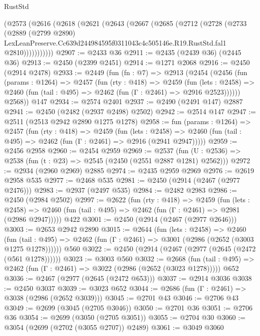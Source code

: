 \begin{lexlean}{RustStd}
\begin{coremodule}
    (@2573
      (@2616
        (@2618
          (@2621
            (@2643
              (@2667
                (@2685
                  (@2712
                    (@2728
                      (@2733
                        (@2889
                          (@2799 @2890)
                          LexLeanPreserve.Cc639d244984595f0311043c4c505146e.R19.RustStd.fal1
                          @2810)))))))))))
@2907 := @2433 @36
@2911 := @2435 (@2439 @36) (@2445 @36)
@2913 := @2450 (@2399 @2451)
@2914 := @1271 @2068
@2916 := @2450 (@2914 @2478)
@2933 := @2449
    (fun (fn : @7) =>
    @2913
      (@2454
        (@2456
          (fun (params : @1264) =>
          @2457
            (fun (rty : @418) =>
            @2459
              (fun (lets : @2458) =>
              @2460 (fun (tail : @495) => @2462 (fun (Γ : @2461) => @2916 @2523))))))
        @2568))
    @147
@2934 := @2574 @2401
@2937 := @2490 (@2491 @147) @2887
@2941 := @2450 (@2482 (@2937 @2498) @2502)
@2942 := @2514 @147
@2947 := @2511 (@2513 @2942 @2890 @1275 @1278)
@2958 := fun (params : @1264) =>
  @2457
    (fun (rty : @418) =>
    @2459
      (fun (lets : @2458) =>
      @2460 (fun (tail : @495) => @2462 (fun (Γ : @2461) => @2916 (@2941 @2947)))))
@2959 := @2456 @2958
@2960 := @2454 @2959
@2969 := @2537 (fun (U : @2536) => @2538 (fun (t : @23) => @2545 (@2450 (@2551 @2887 @1281) @2562)))
@2972 := @2934 (@2960 @2969) @2885
@2974 := @2435 @2959 @2969
@2976 := @2619 @2958 @535
@2977 := @2468 @535
@2981 := @2450 (@2914 (@2467 (@2977 @2476)))
@2983 := @2937 (@2497 @535)
@2984 := @2482 @2983
@2986 := @2450 (@2984 @2502)
@2997 := @2622
    (fun (rty : @418) =>
    @2459
      (fun (lets : @2458) =>
      @2460 (fun (tail : @495) => @2462 (fun (Γ : @2461) => @2981 (@2986 @2947)))))
    @422
@3001 := @2450 (@2914 (@2467 (@2977 @2646)))
@3003 := @2653 @2942 @2890
@3015 := @2644
    (fun (lets : @2458) =>
    @2460
      (fun (tail : @495) => @2462 (fun (Γ : @2461) => @3001 (@2986 (@2652 (@3003 @1275 @1278))))))
    @560
@3022 := @2450 (@2914 (@2467 (@2977 (@2645 (@2472 (@561 @1278))))))
@3023 := @3003 @560
@3032 := @2668
    (fun (tail : @495) => @2462 (fun (Γ : @2461) => @3022 (@2986 (@2652 (@3023 @1278)))))
    @652
@3036 := @2467 (@2977 (@2645 (@2472 @653)))
@3037 := @2914 @3036
@3038 := @2450 @3037
@3039 := @3023 @652
@3044 := @2686 (fun (Γ : @2461) => @3038 (@2986 (@2652 @3039)))
@3045 := @2701 @43
@3046 := @2706 @43
@3049 := @2699 (@3045 (@2705 @3046))
@3050 := @2701 @36
@3051 := @2706 @36
@3054 := @2699 (@3050 (@2705 @3051))
@3055 := @2704 @30
@3060 := @3054 (@2699 (@2702 (@3055 @2707)) @2489)
@3061 := @3049 @3060

\end{coremodule}
\end{lexlean}
